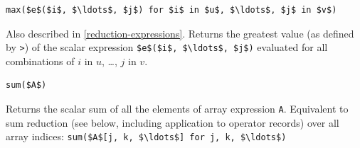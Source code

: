 \begin{operatordefinition*}[max]\label{modelica:max-reduction}
\begin{synopsis}\begin{lstlisting}
max($e$($i$, $\ldots$, $j$) for $i$ in $u$, $\ldots$, $j$ in $v$)
\end{lstlisting}\end{synopsis}
\begin{semantics}
Also described in \cref{reduction-expressions}.
Returns the greatest value (as defined by \lstinline!>!) of the scalar expression \lstinline!$e$($i$, $\ldots$, $j$)! evaluated for all combinations of $i$ in $u$, \ldots, $j$ in $v$.
\end{semantics}
\end{operatordefinition*}

\begin{operatordefinition*}[sum]\label{modelica:sum-of-array}
\begin{synopsis}\begin{lstlisting}
sum($A$)
\end{lstlisting}\end{synopsis}
\begin{semantics}
Returns the scalar sum of all the elements of array expression \lstinline!A!.
Equivalent to sum reduction (see below, including application to operator records) over all array indices: \lstinline!sum($A$[j, k, $\ldots$] for j, k, $\ldots$)!
\end{semantics}
\end{operatordefinition*}

